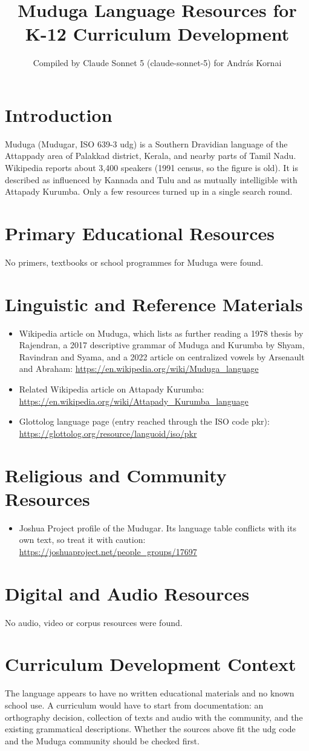 \documentclass[12pt]{article}
\title{Muduga Language Resources for K-12 Curriculum Development}
\author{Compiled by Claude Sonnet 5 (claude-sonnet-5) for Andr\'as Kornai}
\date{}
\begin{document}
\maketitle
\section{Introduction}
Muduga (Mudugar, ISO 639-3 udg) is a Southern Dravidian language of the Attappady area of Palakkad district, Kerala, and nearby parts of Tamil Nadu. Wikipedia reports about 3,400 speakers (1991 census, so the figure is old). It is described as influenced by Kannada and Tulu and as mutually intelligible with Attapady Kurumba. Only a few resources turned up in a single search round.
\section{Primary Educational Resources}
No primers, textbooks or school programmes for Muduga were found.
\section{Linguistic and Reference Materials}
\begin{itemize}
\item Wikipedia article on Muduga, which lists as further reading a 1978 thesis by Rajendran, a 2017 descriptive grammar of Muduga and Kurumba by Shyam, Ravindran and Syama, and a 2022 article on centralized vowels by Arsenault and Abraham: \url{https://en.wikipedia.org/wiki/Muduga_language}
\item Related Wikipedia article on Attapady Kurumba: \url{https://en.wikipedia.org/wiki/Attapady_Kurumba_language}
\item Glottolog language page (entry reached through the ISO code pkr): \url{https://glottolog.org/resource/languoid/iso/pkr}
\end{itemize}
\section{Religious and Community Resources}
\begin{itemize}
\item Joshua Project profile of the Mudugar. Its language table conflicts with its own text, so treat it with caution: \url{https://joshuaproject.net/people_groups/17697}
\end{itemize}
\section{Digital and Audio Resources}
No audio, video or corpus resources were found.
\section{Curriculum Development Context}
The language appears to have no written educational materials and no known school use. A curriculum would have to start from documentation: an orthography decision, collection of texts and audio with the community, and the existing grammatical descriptions. Whether the sources above fit the udg code and the Muduga community should be checked first.
\end{document}
